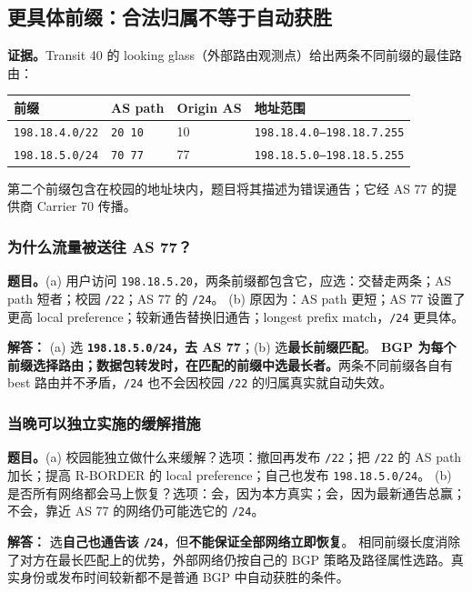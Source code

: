 \documentclass[11pt,a4paper,fontset=fandol]{ctexart}
\renewcommand{\exercisequestion}[2]{%
  \Needspace{5\baselineskip}%
  \subsubsection{#2}\label{exercise:#1}%
}
\renewenvironment{checkedsolution}
  {\par\nopagebreak[4]\textbf{解答：}\ignorespaces}
  {\par}
\begin{document}
\subsection{更具体前缀：合法归属不等于自动获胜}

\textbf{证据。}Transit 40 的 looking glass（外部路由观测点）给出两条不同前缀的最佳路由：
\begin{center}
\small
\begin{tabular}{@{}llll@{}}
\toprule
前缀 & AS path & Origin AS & 地址范围 \\
\midrule
\texttt{198.18.4.0/22} & \texttt{20 10} & 10 & \texttt{198.18.4.0--198.18.7.255} \\
\texttt{198.18.5.0/24} & \texttt{70 77} & 77 & \texttt{198.18.5.0--198.18.5.255} \\
\bottomrule
\end{tabular}
\end{center}
第二个前缀包含在校园的地址块内，题目将其描述为错误通告；它经 AS 77 的提供商 Carrier 70 传播。

\exercisequestion{SC2008-HW03-Q19}{为什么流量被送往 AS 77？}
\textbf{题目。}(a) 用户访问 \texttt{198.18.5.20}，两条前缀都包含它，应选：交替走两条；AS path 短者；校园 \texttt{/22}；AS 77 的 \texttt{/24}。
(b) 原因为：AS path 更短；AS 77 设置了更高 local preference；较新通告替换旧通告；longest prefix match，\texttt{/24} 更具体。
\begin{checkedsolution}
(a) 选 \textbf{\texttt{198.18.5.0/24}，去 AS 77}；(b) 选\textbf{最长前缀匹配}。
\textbf{BGP 为每个前缀选择路由；数据包转发时，在匹配的前缀中选最长者。}两条不同前缀各自有 best 路由并不矛盾，\texttt{/24} 也不会因校园 \texttt{/22} 的归属真实就自动失效。
\end{checkedsolution}

\exercisequestion{SC2008-HW03-Q20}{当晚可以独立实施的缓解措施}
\textbf{题目。}(a) 校园能独立做什么来缓解？选项：撤回再发布 \texttt{/22}；把 \texttt{/22} 的 AS path 加长；提高 R-BORDER 的 local preference；自己也发布 \texttt{198.18.5.0/24}。
(b) 是否所有网络都会马上恢复？选项：会，因为本方真实；会，因为最新通告总赢；不会，靠近 AS 77 的网络仍可能选它的 \texttt{/24}。
\begin{checkedsolution}
选\textbf{自己也通告该 \texttt{/24}}，但\textbf{不能保证全部网络立即恢复}。
相同前缀长度消除了对方在最长匹配上的优势，外部网络仍按自己的 BGP 策略及路径属性选路。真实身份或发布时间较新都不是普通 BGP 中自动获胜的条件。
\end{checkedsolution}
\end{document}

